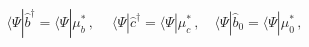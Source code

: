\begin{equation}
\langle \Psi |\hat{b}^{\dagger }=\langle \Psi |\mu _{b}^{\ast }\,,\quad
~\langle \Psi |\hat{c}^{\dagger }=\langle \Psi |\mu _{c}^{\ast }\,,\quad
\langle \Psi |\hat{b}_{0}=\langle \Psi |\mu _{0}^{\ast }\,,
\end{equation}

